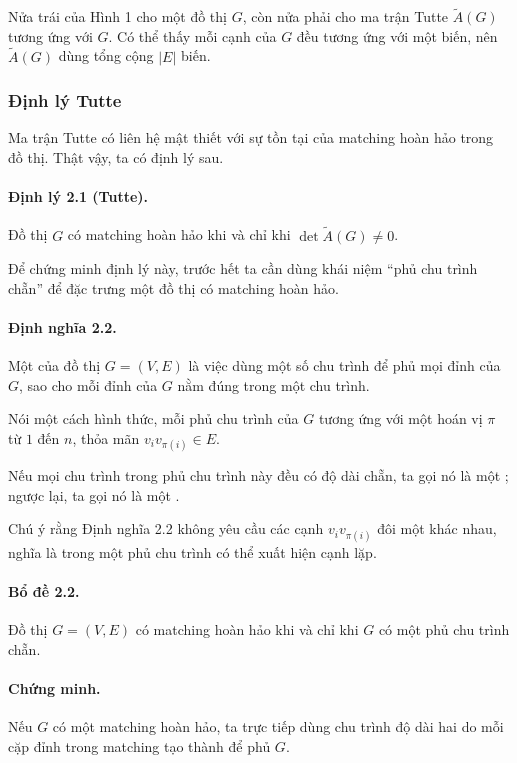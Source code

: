 \documentclass[11pt]{article}
\begin{document}
Nửa trái của Hình 1 cho một đồ thị \(G\), còn nửa phải cho ma trận Tutte
\(\tilde A(G)\) tương ứng với \(G\). Có thể thấy mỗi cạnh của \(G\) đều tương
ứng với một biến, nên \(\tilde A(G)\) dùng tổng cộng \(|E|\) biến.

\subsubsection{Định lý Tutte}

Ma trận Tutte có liên hệ mật thiết với sự tồn tại của matching hoàn hảo trong
đồ thị. Thật vậy, ta có định lý sau.

\paragraph{Định lý 2.1 (Tutte).}
Đồ thị \(G\) có matching hoàn hảo khi và chỉ khi
\(\det\tilde A(G)\ne 0\).

Để chứng minh định lý này, trước hết ta cần dùng khái niệm ``phủ chu trình
chẵn'' để đặc trưng một đồ thị có matching hoàn hảo.

\paragraph{Định nghĩa 2.2.}
Một  của đồ thị \(G=(V,E)\) là việc dùng một số chu trình
để phủ mọi đỉnh của \(G\), sao cho mỗi đỉnh của \(G\) nằm đúng trong một chu
trình.

Nói một cách hình thức, mỗi phủ chu trình của \(G\) tương ứng với một hoán vị
\(\pi\) từ \(1\) đến \(n\), thỏa mãn \(v_i v_{\pi(i)}\in E\).

Nếu mọi chu trình trong phủ chu trình này đều có độ dài chẵn, ta gọi nó là một
; ngược lại, ta gọi nó là một .

Chú ý rằng Định nghĩa 2.2 không yêu cầu các cạnh \(v_i v_{\pi(i)}\) đôi một
khác nhau, nghĩa là trong một phủ chu trình có thể xuất hiện cạnh lặp.

\paragraph{Bổ đề 2.2.}
Đồ thị \(G=(V,E)\) có matching hoàn hảo khi và chỉ khi \(G\) có một phủ chu
trình chẵn.

\paragraph{Chứng minh.}
Nếu \(G\) có một matching hoàn hảo, ta trực tiếp dùng chu trình độ dài hai do
mỗi cặp đỉnh trong matching tạo thành để phủ \(G\).
\end{document}
